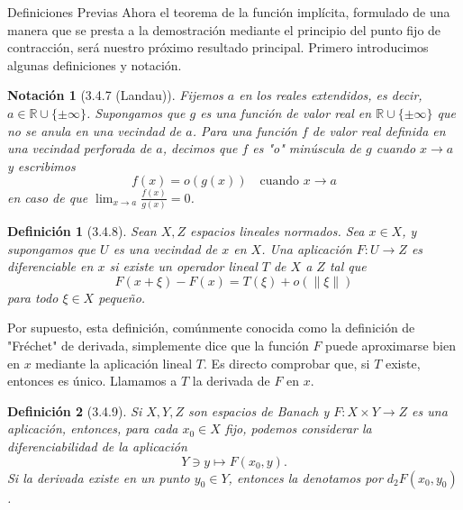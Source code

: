 \documentclass[10pt]{beamer}
\newtheorem{definicion}{Definición}
\newtheorem{notacion}{Notación}
\begin{document}
	\begin{frame}[allowframebreaks]{Definiciones Previas}
		Ahora el teorema de la función implícita, formulado de una manera que se presta a la demostración mediante el principio del punto fijo de contracción, será nuestro próximo resultado principal. Primero introducimos algunas definiciones y notación.
		
		\begin{notacion}[3.4.7 (Landau)]
			Fijemos $a$ en los reales extendidos, es decir, $a \in \mathbb{R} \cup \{\pm\infty\}$. Supongamos que $g$ es una función de valor real en $\mathbb{R} \cup \{\pm\infty\}$ que no se anula en una vecindad de $a$. Para una función $f$ de valor real definida en una vecindad perforada de $a$, decimos que $f$ es "o" minúscula de $g$ cuando $x \to a$ y escribimos
			\[ f(x) = o(g(x)) \quad \text{cuando } x \to a \]
			en caso de que $\lim_{x \to a} \frac{f(x)}{g(x)} = 0$.
		\end{notacion}
		
		\framebreak
		
		\begin{definicion}[3.4.8]
			Sean $X, Z$ espacios lineales normados. Sea $x \in X$, y supongamos que $U$ es una vecindad de $x$ en $X$. Una aplicación $F : U \to Z$ es diferenciable en $x$ si existe un operador lineal $T$ de $X$ a $Z$ tal que
			\[ F(x + \xi) - F(x) = T(\xi) + o(\|\xi\|) \]
			para todo $\xi \in X$ pequeño.
		\end{definicion}
		
		Por supuesto, esta definición, comúnmente conocida como la definición de "Fréchet" de derivada, simplemente dice que la función $F$ puede aproximarse bien en $x$ mediante la aplicación lineal $T$. Es directo comprobar que, si $T$ existe, entonces es único. Llamamos a $T$ la derivada de $F$ en $x$.
		
		\framebreak
		
		\begin{definicion}[3.4.9]
			Si $X, Y, Z$ son espacios de Banach y $F : X \times Y \to Z$ es una aplicación, entonces, para cada $x_0 \in X$ fijo, podemos considerar la diferenciabilidad de la aplicación
			\[ Y \ni y \mapsto F(x_0, y). \]
			Si la derivada existe en un punto $y_0 \in Y$, entonces la denotamos por $d_2 F(x_0, y_0)$.
		\end{definicion}
	\end{frame}
	
\end{document}
